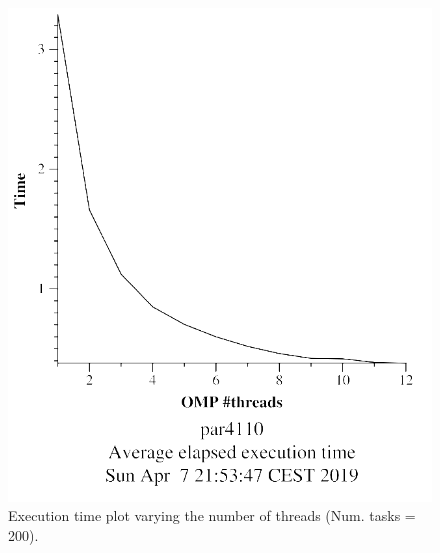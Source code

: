\documentclass[12pt, a4paper]{article}
\begin{document}
\begin{figure}[H]
\centering
\begin{minipage}[b]{0.4\linewidth}
  \centering
  \includegraphics[scale=0.5]{./mandel-omp-10000-strong-omp-24-200-time}
  \caption{Execution time plot varying the number of threads (Num. tasks = 200).}
  \label{fig:mandel-omp-10000-strong-omp-24-200-time}
\end{minipage}%
\hspace{0.5cm}
\begin{minipage}[b]{0.4\linewidth}
  \centering

\end{minipage}
\end{figure}
\end{document}
